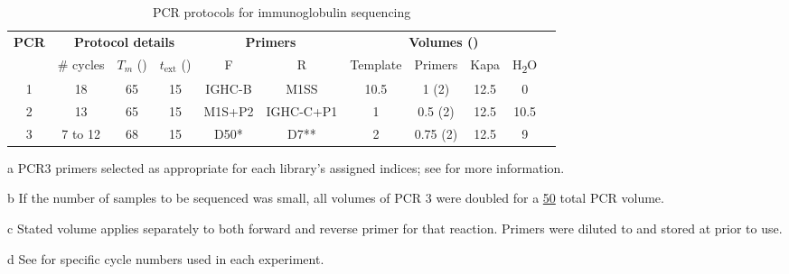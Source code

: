 \begin{table}[h]
\def\arraystretch{1.3}
\centering\small
\begin{threeparttable}
\caption{PCR protocols for \Nfu immunoglobulin sequencing}
\begin{tabular}{c|ccc|cc|ccccc}\toprule
\multirow{2}{*}{\textbf{PCR}} & \multicolumn{3}{c|}{\textbf{Protocol details}} & \multicolumn{2}{c|}{\textbf{Primers}} & \multicolumn{4}{c}{\textbf{Volumes (\ul{})\tnote{b}}}\\
 & \# cycles & $T_m$ (\degC{}) & $t_\mathrm{ext}$ (\secs{}) & F & R & Template & Primers\tnote{c} & Kapa & H\textsubscript{2}O \\\midrule
1 & 18 & 65 & 15 & IGHC-B & M1SS & 10.5 & 1 (\x{}2) & 12.5 & 0 \\\midrule
2 & 13 & 65 & 15 & M1S+P2 & IGHC-C+P1 & 1 & 0.5 (\x{}2) & 12.5 & 10.5 \\\midrule
3 & 7 to 12\tnote{d} & 68 & 15 & D50*\tnote{a} & D7**\tnote{a} & 2 & 0.75 (\x{}2) & 12.5 & 9 \\
\bottomrule
\end{tabular}
\begin{tablenotes}
\item[a] PCR3 primers selected as appropriate for each library's assigned indices; see  for more information.
\item[b] If the number of samples to be sequenced was small, all volumes of PCR 3 were doubled for a \ul{50} total PCR volume.
\item[c] Stated volume applies separately to both forward and reverse primer for that reaction. Primers were diluted to and stored at  prior to use.
\item[d] See  for specific cycle numbers used in each experiment.
\end{tablenotes}
\label{tab:methods_igseq_pcr}
\end{threeparttable}
\end{table}

